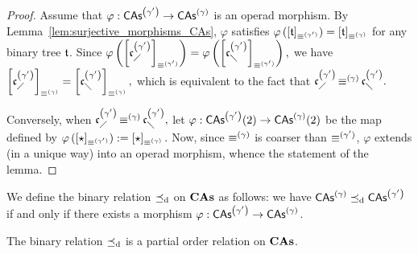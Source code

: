 \begin{proof}
    Assume that $\varphi:\mathsf{CAs}^{\left(\gamma'\right)} \to \mathsf{CAs}^{\left(\gamma\right)}$ is an operad
    morphism. By Lemma~\ref{lem:surjective_morphisms_CAs}, $\varphi$
    satisfies
    \begin{math}
        \varphi\left(\left[\mathfrak{t}\right]_{\operatorname{\equiv}^{(\gamma')}}\right)
        = \left[\mathfrak{t}\right]_{\operatorname{\equiv}^{(\gamma)}}
    \end{math}
    for any binary tree $\mathfrak{t}$.
    Since
    \begin{math}
        \varphi\left(
        \left[\mathfrak{c}^{\left(\gamma'\right)}_{\diagup}\right]_{\operatorname{\equiv}^{(\gamma')}}
        \right)
        =
        \varphi\left(
        \left[\mathfrak{c}^{\left(\gamma'\right)}_{\diagdown}\right]_{\operatorname{\equiv}^{(\gamma')}}
        \right),
    \end{math}
    we have
    \begin{math}
        \left[\mathfrak{c}^{\left(\gamma'\right)}_{\diagup}\right]_{\operatorname{\equiv}^{(\gamma)}}
        =
        \left[\mathfrak{c}^{\left(\gamma'\right)}_{\diagdown}\right]_{\operatorname{\equiv}^{(\gamma)}},
    \end{math}
    which is equivalent to the fact that
    \begin{math}
        \mathfrak{c}^{\left(\gamma'\right)}_{\diagup} \operatorname{\equiv}^{(\gamma)} \mathfrak{c}^{\left(\gamma'\right)}_{\diagdown}.
    \end{math}
    \smallbreak

    Conversely, when
    \begin{math}
        \mathfrak{c}^{\left(\gamma'\right)}_{\diagup}\operatorname{\equiv}^{(\gamma)}\mathfrak{c}^{\left(\gamma'\right)}_{\diagdown},
    \end{math}
    let $\varphi:\mathsf{CAs}^{\left(\gamma'\right)}(2) \to \mathsf{CAs}^{\left(\gamma\right)}(2)$ be the map
    defined by
    \begin{math}
        \varphi\left(
        \left[\operatorname{\star}\right]_{\operatorname{\equiv}^{(\gamma')}}\right)
        :=
        \left[\operatorname{\star}\right]_{\operatorname{\equiv}^{(\gamma)}}.
    \end{math}
    Now, since $\operatorname{\equiv}^{(\gamma)}$ is coarser than $\operatorname{\equiv}^{(\gamma')}$,
    $\varphi$ extends (in a unique way) into an operad morphism, whence
    the statement of the lemma.
\end{proof}
\medbreak

We define the binary relation $\preceq_{\mathrm{d}}$ on $\mathbf{CAs}$ as follows: we have
$\mathsf{CAs}^{\left(\gamma\right)} \preceq_{\mathrm{d}} \mathsf{CAs}^{\left(\gamma'\right)}$ if and only if there exists a
morphism $\varphi:\mathsf{CAs}^{\left(\gamma'\right)} \to \mathsf{CAs}^{\left(\gamma\right)}$.
\medbreak

\begin{Proposition}\label{prop:poset_CAs}
    The binary relation $\preceq_{\mathrm{d}}$ is a partial order relation on
    $\mathbf{CAs}$.
\end{Proposition}

